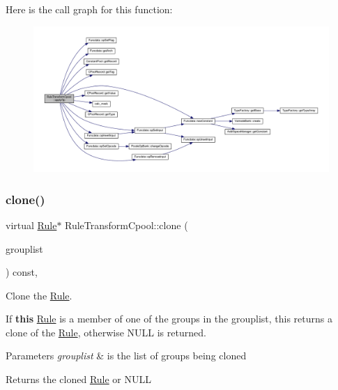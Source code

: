 Here is the call graph for this function\+:
\nopagebreak
\begin{figure}[H]
\begin{center}
\leavevmode
\includegraphics[width=350pt]{class_rule_transform_cpool_af499e077d284de28aa52a807b53152de_cgraph}
\end{center}
\end{figure}
\mbox{\label{class_rule_transform_cpool_a0221ad873217f4dbad2e59e5ef37e23e}} 
\subsubsection{\texorpdfstring{clone()}{clone()}}
{\footnotesize\ttfamily virtual \mbox{\hyperlink{class_rule}{Rule}}$\ast$ Rule\+Transform\+Cpool\+::clone (\begin{DoxyParamCaption}\item[{const \mbox{\hyperlink{class_action_group_list}{Action\+Group\+List}} \&}]{grouplist }\end{DoxyParamCaption}) const\hspace{0.3cm}{\ttfamily [inline]}, {\ttfamily [virtual]}}



Clone the \mbox{\hyperlink{class_rule}{Rule}}. 

If {\bfseries{this}} \mbox{\hyperlink{class_rule}{Rule}} is a member of one of the groups in the grouplist, this returns a clone of the \mbox{\hyperlink{class_rule}{Rule}}, otherwise N\+U\+LL is returned. 
\begin{DoxyParams}{Parameters}
{\em grouplist} & is the list of groups being cloned \\
\hline
\end{DoxyParams}
\begin{DoxyReturn}{Returns}
the cloned \mbox{\hyperlink{class_rule}{Rule}} or N\+U\+LL 
\end{DoxyReturn}


